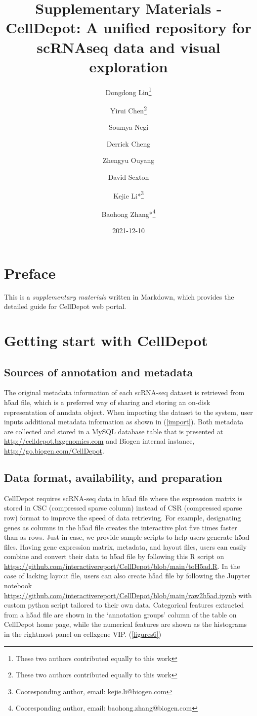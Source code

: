 \documentclass[
  openany]{book}
\title{Supplementary Materials - CellDepot: A unified repository for scRNAseq data and visual exploration}
\author{Dongdong Lin\footnote{These two authors contributed equally to this work} \and Yirui Chen\footnote{These two authors contributed equally to this work} \and Soumya Negi \and Derrick Cheng \and Zhengyu Ouyang \and David Sexton \and Kejie Li*\footnote{Cooresponding author, email: kejie.li@biogen.com} \and Baohong Zhang*\footnote{Cooresponding author, email: baohong.zhang@biogen.com}}
\date{2021-12-10}
\begin{document}
\maketitle

{
\setcounter{tocdepth}{1}
\tableofcontents
}
\hypertarget{preface}{%
\chapter{Preface}\label{preface}}

This is a \emph{supplementary materials} written in Markdown, which provides the detailed guide for CellDepot web portal.

\hypertarget{getting-start-with-celldepot}{%
\chapter{Getting start with CellDepot}\label{getting-start-with-celldepot}}

\hypertarget{sources-of-annotation-and-metadata}{%
\section{Sources of annotation and metadata}\label{sources-of-annotation-and-metadata}}

The original metadata information of each scRNA-seq dataset is retrieved from h5ad file, which is a preferred way of sharing and storing an on-disk representation of anndata object. When importing the dataset to the system, user inputs additional metadata information as shown in (\ref{import}). Both metadata are collected and stored in a MySQL database table that is presented at \url{http://celldepot.bxgenomics.com} and Biogen internal instance, \url{http://go.biogen.com/CellDepot}.

\hypertarget{data-format-availability-and-preparation}{%
\section{Data format, availability, and preparation}\label{data-format-availability-and-preparation}}

CellDepot requires scRNA-seq data in h5ad file where the expression matrix is stored in CSC (compressed sparse column) instead of CSR (compressed sparse row) format to improve the speed of data retrieving. For example, designating genes as columns in the h5ad file creates the interactive plot five times faster than as rows. Just in case, we provide sample scripts to help users generate h5ad files. Having gene expression matrix, metadata, and layout files, users can easily combine and convert their data to h5ad file by following this R script on \url{https://github.com/interactivereport/CellDepot/blob/main/toH5ad.R}. In the case of lacking layout file, users can also create h5ad file by following the Jupyter notebook \url{https://github.com/interactivereport/CellDepot/blob/main/raw2h5ad.ipynb} with custom python script tailored to their own data. Categorical features extracted from a h5ad file are shown in the `annotation groups' column of the table on CellDepot home page, while the numerical features are shown as the histograms in the rightmost panel on cellxgene VIP. (\ref{figures6})
\end{document}
